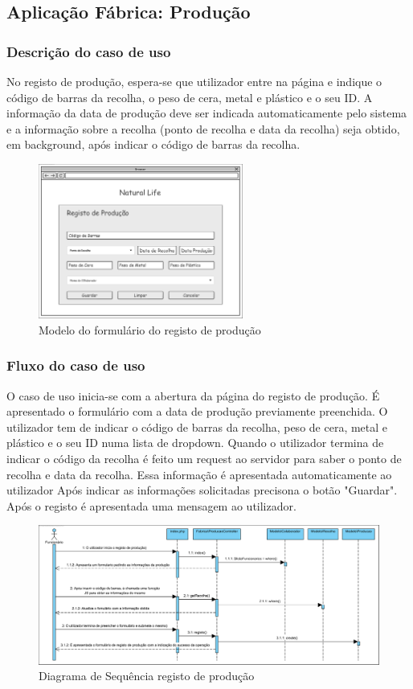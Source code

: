\subsection{Aplicação Fábrica: Produção}
\subsubsection*{Descrição do caso de uso}
No registo de produção, espera-se que utilizador entre na página e indique o código de barras da recolha, o peso de cera, metal e plástico e o seu ID. A informação da data de produção deve ser indicada automaticamente pelo sistema e a informação sobre a recolha (ponto de recolha e data da recolha) seja obtido, em background, após indicar o código de barras da recolha.

\begin{figure}[H] 
	\begin{center}
		\includegraphics[width=0.60\textwidth,keepaspectratio]{figuras/Diagramas_vp/DI_Fabrica_3-Registo_de_Produção.png}
		\caption{Modelo do formulário do registo de produção}
		\label{fig:di_producao} 
	\end{center}
\end{figure}

\subsubsection*{Fluxo do caso de uso}
O caso de uso inicia-se com a abertura da página do registo de produção. É apresentado o formulário com a data de produção previamente preenchida. O utilizador tem de indicar o código de barras da recolha, peso de cera, metal e plástico e o seu ID numa lista de dropdown. Quando o utilizador termina de indicar o código da recolha é feito um request ao servidor para saber o ponto de recolha e data da recolha. Essa informação é apresentada automaticamente ao utilizador Após indicar as informações solicitadas precisona o botão "Guardar". Após o registo é apresentada uma mensagem ao utilizador.

\begin{figure}[H] 
	\begin{center}
		\includegraphics[width=\textwidth,keepaspectratio]{figuras/Diagramas_vp/SD_Fabrica_3-Registo_de_Produção.png}
		\caption{Diagrama de Sequência registo de produção}
		\label{fig:sd_producao} 
	\end{center}
\end{figure}